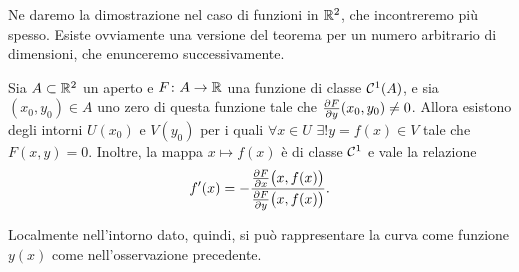 Ne daremo la dimostrazione nel caso di funzioni in $\mathbb{R}^2$, che incontreremo più spesso.
Esiste ovviamente una versione del teorema per un numero arbitrario di dimensioni, che enunceremo successivamente.
\begin{teorema}[di Dini] \label{t:dini-R2}
	Sia $A\subset\mathbb{R}^2$ un aperto e $F\colon A\to\mathbb{R}$ una funzione di classe $\mathcal{C}^{{1}}(A)$, e sia $(x_0,y_0)\in A$ uno zero di questa funzione tale che $\frac{\partial {F}}{\partial {y}}(x_0,y_0)\neq 0$.
	Allora esistono degli intorni $U(x_0)$ e $V(y_0)$ per i quali $\forall x\in U$ $\exists! y=f(x)\in V$ tale che $F(x,y)=0$. Inoltre, la mappa $x\mapsto f(x)$ è di classe $\mathcal{C}^{{1}}$ e vale la relazione
	\begin{equation}
		f'(x)=-\dfrac{\frac{\partial {F}}{\partial {x}}\big(x,f(x)\big)}{\frac{\partial {F}}{\partial {y}}\big(x,f(x)\big)}.
		\label{eq:dini-R2}
	\end{equation}
\end{teorema}
Localmente nell'intorno dato, quindi, si può rappresentare la curva come funzione $y(x)$ come nell'osservazione precedente.
